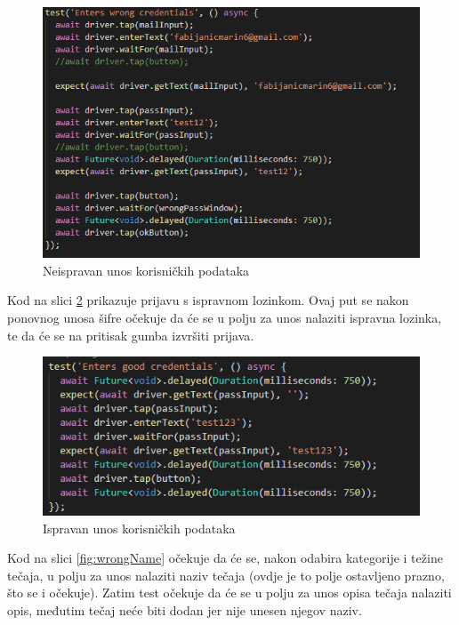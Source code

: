 			\begin{figure}[h]
				\includegraphics[scale=0.75]{slike/wrongCred.PNG}
				\centering
				\caption{Neispravan unos korisničkih podataka}
				\label{fig:wrongCred}
			\end{figure}
			
			Kod na slici \ref{fig:goodCred} prikazuje prijavu s ispravnom lozinkom. Ovaj put se nakon ponovnog unosa šifre očekuje da će se u polju za unos nalaziti ispravna lozinka, te da će se na pritisak gumba izvršiti prijava.
			
			\begin{figure}[h]
				\includegraphics[scale=0.75]{slike/goodCred.PNG}
				\centering
				\caption{Ispravan unos korisničkih podataka}
				\label{fig:goodCred}
			\end{figure}
			
			
			\eject
			
			Kod na slici \ref{fig:wrongName} očekuje da će se, nakon odabira kategorije i težine tečaja, u polju za unos nalaziti naziv tečaja (ovdje je to polje ostavljeno prazno, što se i očekuje). Zatim test očekuje da će se u polju za unos opisa tečaja nalaziti opis, međutim tečaj neće biti dodan jer nije unesen njegov naziv.
			
